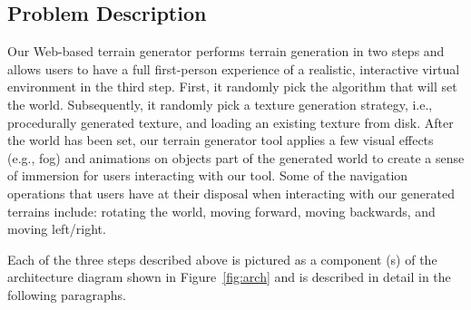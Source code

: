 \subsection{Problem Description}
Our Web-based terrain generator performs terrain generation in two steps and allows users to have a full first-person experience of a realistic, interactive virtual environment in the third step. First, it randomly pick the algorithm that will set the world. Subsequently, it randomly pick a texture generation strategy, i.e., procedurally generated texture, and loading an existing texture from disk. After the world has been set, our terrain generator tool applies a few visual effects (e.g., fog) and animations on objects part of the generated world to create a sense of immersion for users interacting with our tool. Some of the navigation operations that users have at their disposal when interacting with our generated terrains include: rotating the world, moving forward, moving backwards, and moving left/right.  

Each of the three steps described above is pictured as a component (s) of the architecture diagram shown in Figure~\ref{fig:arch} and is described in detail in the following paragraphs.

